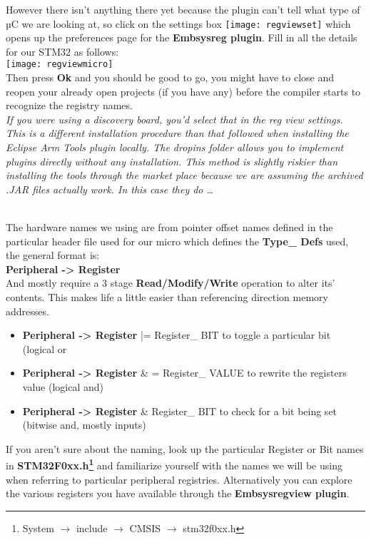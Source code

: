 {{{\begin{minipage}{0.9\textwidth}
\justifying
However there isn't anything there yet because the plugin can't tell what type of µC we are looking at, so click on the settings box \texttt{[image: regviewset]} which opens up the preferences page for the \textbf{Embsysreg plugin}. Fill in all the details for our STM32 as follows:
\\
\centering
\texttt{[image: regviewmicro]}
\\
\justifying
Then press \textbf{\color{Aquamarine} Ok }and you should be good to go, you might have to close and reopen your already open projects (if you have any) before the compiler starts to recognize the registry names.
\\
\emph{\color{Gray} If you were using a discovery board, you'd select that in the reg view settings. This is a different installation procedure than that followed when installing the Eclipse Arm Tools plugin locally. The dropins folder allows you to implement plugins directly without any installation. This method is slightly riskier than installing the tools through the market place because we are assuming the archived .JAR files actually work. In this case they do \ldots}
\end{minipage}
}
\\
The hardware names we using are from pointer offset names defined in the particular header file used for our micro which defines the \textbf{Type\_ Defs} used, the general format is:\\
\textbf{Peripheral -> Register}\\
And mostly require a 3 stage \textbf{\color{Aquamarine} Read/Modify/Write} operation to alter its' contents. This makes life a little easier than referencing direction memory addresses.
\\
\underline{}
\begin{itemize}
\item {
\textbf{Peripheral -> Register} |= Register\_ BIT to toggle a particular bit (logical or}
\item{\textbf{Peripheral -> Register} \& = Register\_ VALUE to rewrite the registers value (logical and)} 
\item{\textbf{Peripheral -> Register} \& Register\_ BIT to check for a bit being set (bitwise and, mostly inputs)}
\end{itemize}
If you aren't sure about the naming, look up the particular Register or Bit names in \textbf{\color{Aquamarine} STM32F0xx.h\footnote{System $\rightarrow$ include $\rightarrow$ CMSIS $\rightarrow$ stm32f0xx.h}}  and familiarize yourself with the names we will be using when referring to particular peripheral registries. Alternatively you can explore the various registers you have available through the \textbf{\color{Purple} Embsysregview plugin}.
}}
